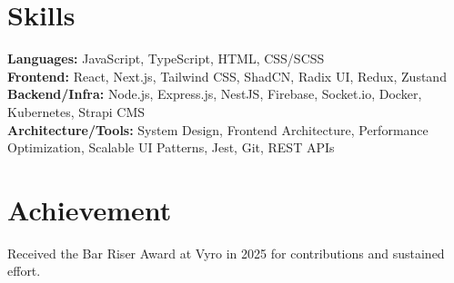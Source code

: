 \documentclass[9pt,letterpaper]{article}
\begin{document}
\section*{Skills}
\textbf{Languages:} JavaScript, TypeScript, HTML, CSS/SCSS \\
\textbf{Frontend:} React, Next.js, Tailwind CSS, ShadCN, Radix UI, Redux, Zustand \\
\textbf{Backend/Infra:} Node.js, Express.js, NestJS, Firebase, Socket.io, Docker, Kubernetes, Strapi CMS \\
\textbf{Architecture/Tools:} System Design, Frontend Architecture, Performance Optimization, Scalable UI Patterns, Jest, Git, REST APIs

\section*{Achievement}
Received the Bar Riser Award at Vyro in 2025 for contributions and sustained effort.
\end{document}

